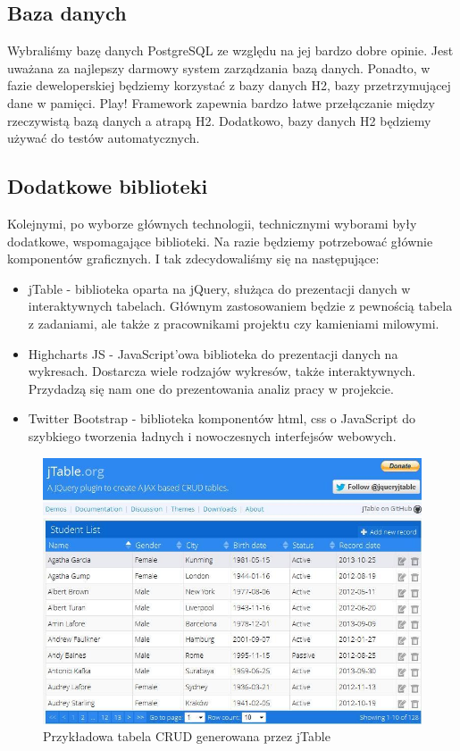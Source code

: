 \documentclass[a4paper,12pt,notitlepage]{mwrep}
\begin{document}
\subsection{Baza danych}
Wybraliśmy bazę danych PostgreSQL ze względu na jej bardzo dobre opinie. Jest uważana za najlepszy darmowy system zarządzania 
bazą danych. Ponadto, w fazie deweloperskiej będziemy korzystać z bazy danych H2, bazy przetrzymującej dane w pamięci. Play! 
Framework zapewnia bardzo łatwe przełączanie między rzeczywistą bazą danych a atrapą H2. Dodatkowo, bazy danych H2 będziemy 
używać do testów automatycznych.

\subsection{Dodatkowe biblioteki}
Kolejnymi, po wyborze głównych technologii, technicznymi wyborami były dodatkowe, wspomagające biblioteki. Na razie 
będziemy potrzebować głównie komponentów graficznych. I tak zdecydowaliśmy się na następujące:
\begin{itemize}
	\item	jTable - biblioteka oparta na jQuery, służąca do prezentacji danych w interaktywnych tabelach. Głównym 
		zastosowaniem będzie z pewnością tabela z zadaniami, ale także z pracownikami projektu czy kamieniami 
		milowymi.
	\item	Highcharts JS - JavaScript'owa biblioteka do prezentacji danych na wykresach. Dostarcza wiele rodzajów 
		wykresów, także interaktywnych. Przydadzą się nam one do prezentowania analiz pracy w projekcie.
	\item	Twitter Bootstrap - biblioteka komponentów html, css o JavaScript do szybkiego tworzenia ładnych i nowoczesnych 
		interfejsów webowych.
\end{itemize}

\begin{figure}[H]
\centering
\includegraphics[scale=0.5]{images/jTable.png}
\caption{Przykładowa tabela CRUD generowana przez jTable}
\label{fig:jTable}
\end{figure}
\end{document}
